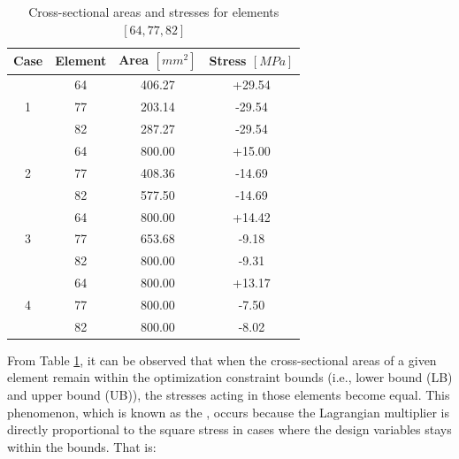 \begin{table}[H]
    \centering

    \begin{tabular}{|c|c|c|c|}
        \hline

        \textbf{Case}      & \textbf{Element} & \textbf{Area $[mm^2]$} & \textbf{Stress $[MPa]$} \\
        \hline
        \multirow{3}{*}{1} & 64               & 406.27                 & +29.54                  \\
                           & 77               & 203.14                 & -29.54                  \\
                           & 82               & 287.27                 & -29.54                  \\
        \hline
        \multirow{3}{*}{2} & 64               & 800.00                 & +15.00                  \\
                           & 77               & 408.36                 & -14.69                  \\
                           & 82               & 577.50                 & -14.69                  \\
        \hline
        \multirow{3}{*}{3} & 64               & 800.00                 & +14.42                  \\
                           & 77               & 653.68                 & -9.18                   \\
                           & 82               & 800.00                 & -9.31                   \\
        \hline
        \multirow{3}{*}{4} & 64               & 800.00                 & +13.17                  \\
                           & 77               & 800.00                 & -7.50                   \\
                           & 82               & 800.00                 & -8.02                   \\
        \hline
    \end{tabular}

    \caption{Cross-sectional areas and stresses for elements $[64, 77, 82]$}
    \label{tab:cb_results}

\end{table}

From Table \ref{tab:cb_results}, it can be observed that when the cross-sectional areas of a given element remain within the optimization constraint bounds (i.e., lower bound (LB) and upper bound (UB)), the stresses acting in those elements become equal.
This phenomenon, which is known as the , occurs because the Lagrangian multiplier is directly proportional to the square stress in cases where the design variables stays within the bounds.
That is:

